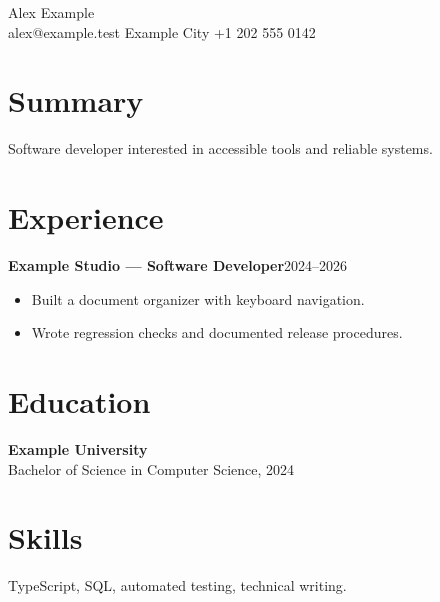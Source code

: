 \documentclass[11pt]{article}
\begin{document}
\begin{center}
{\LARGE Alex Example}\\
alex@example.test \quad Example City \quad +1 202 555 0142
\end{center}
\section*{Summary}
Software developer interested in accessible tools and reliable systems.
\section*{Experience}
\textbf{Example Studio --- Software Developer}\hfill 2024--2026
\begin{itemize}
\item Built a document organizer with keyboard navigation.
\item Wrote regression checks and documented release procedures.
\end{itemize}
\section*{Education}
\textbf{Example University}\\
Bachelor of Science in Computer Science, 2024
\section*{Skills}
TypeScript, SQL, automated testing, technical writing.
\end{document}
